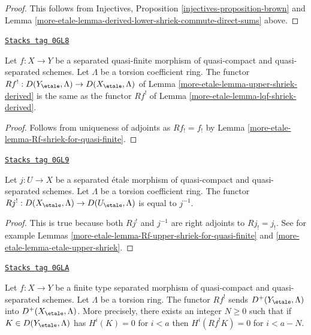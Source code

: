 \begin{proof}
This follows from
Injectives, Proposition \ref{injectives-proposition-brown}
and Lemma \ref{more-etale-lemma-derived-lower-shriek-commute-direct-sums} above.
\end{proof}

\begin{lemma}
\label{more-etale-lemma-Rf-upper-shriek-for-quasi-finite}
\href{https://stacks.math.columbia.edu/tag/0GL8}{\texttt{Stacks tag 0GL8}}

Let $f : X \to Y$ be a separated quasi-finite morphism of quasi-compact
and quasi-separated schemes. Let $\Lambda$ be a torsion coefficient ring.
The functor $Rf^! : D(Y_\etale, \Lambda) \to D(X_\etale, \Lambda)$
of Lemma \ref{more-etale-lemma-upper-shriek-derived} is the same as the functor
$Rf^!$ of Lemma \ref{more-etale-lemma-lqf-shriek-derived}.
\end{lemma}

\begin{proof}
Follows from uniqueness of adjoints as $Rf_! = f_!$ by
Lemma \ref{more-etale-lemma-Rf-shriek-for-quasi-finite}.
\end{proof}

\begin{lemma}
\label{more-etale-lemma-Rf-upper-shriek-for-etale}
\href{https://stacks.math.columbia.edu/tag/0GL9}{\texttt{Stacks tag 0GL9}}

Let $j : U \to X$ be a separated \'etale morphism of quasi-compact
and quasi-separated schemes. Let $\Lambda$ be a torsion coefficient ring.
The functor $Rj^! : D(X_\etale, \Lambda) \to D(U_\etale, \Lambda)$
is equal to $j^{-1}$.
\end{lemma}

\begin{proof}
This is true because both $Rj^!$ and $j^{-1}$ are right adjoints to
$Rj_! = j_!$. See for example Lemmas
\ref{more-etale-lemma-Rf-upper-shriek-for-quasi-finite} and
\ref{more-etale-lemma-etale-upper-shriek}.
\end{proof}

\begin{lemma}
\label{more-etale-lemma-twisted-inverse-image-bounded-below}
\href{https://stacks.math.columbia.edu/tag/0GLA}{\texttt{Stacks tag 0GLA}}

Let $f : X \to Y$ be a finite type separated morphism of
quasi-compact and quasi-separated schemes. Let $\Lambda$ be a torsion
ring. The functor $Rf^!$ sends $D^+(Y_\etale, \Lambda)$ into
$D^+(X_\etale, \Lambda)$. More precisely, there exists an integer
$N \geq 0$ such that if $K \in D(Y_\etale, \Lambda)$ has $H^i(K) = 0$
for $i < a$ then $H^i(Rf^!K) = 0$ for $i < a - N$.
\end{lemma}

